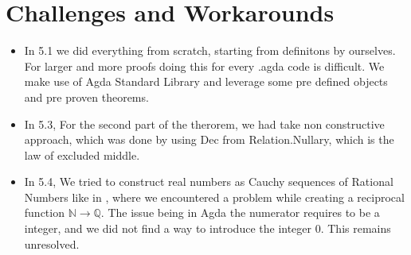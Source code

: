 \documentclass[12pt]{article}
\begin{document}
 

\section{Challenges and Workarounds}

\begin{itemize}
    \item In 5.1 we did everything from scratch, starting from definitons by ourselves. For larger and more proofs doing this for every .agda code is difficult. We make use of Agda Standard Library and leverage some pre defined objects and pre proven theorems.
    \item In 5.3, For the second part of the therorem, we had take non constructive approach, which was done by using Dec from Relation.Nullary, which is the law of excluded middle.
    \item In 5.4, We tried to construct real numbers as Cauchy sequences of Rational Numbers like in \cite{BB85}, where we encountered a problem while creating a reciprocal function $\mathbb{N} \to \mathbb{Q}$. The issue being in Agda the numerator requires to be a integer, and we did not find a way to introduce the integer 0. This remains unresolved.
\end{itemize}
\clearpage

 

\end{document}
